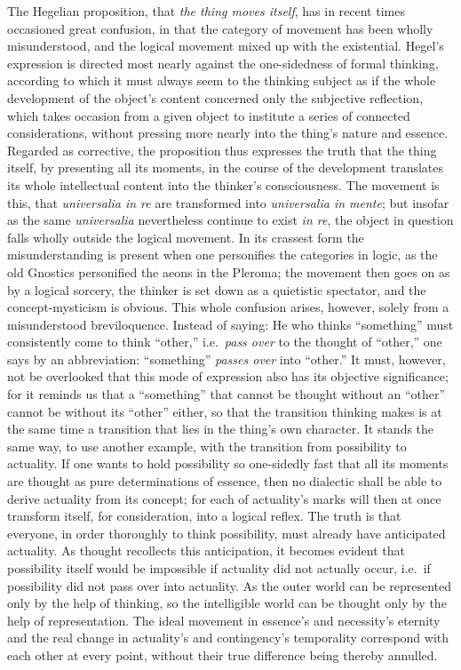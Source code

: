 \documentclass[12pt]{book}
\begin{document}
The Hegelian proposition, that \emph{the thing moves itself}, has in recent
times occasioned great confusion, in that the category of movement has been
wholly misunderstood, and the logical movement mixed up with the
existential. Hegel's expression is directed most nearly against the
one-sidedness of formal thinking, according to which it must always seem to
the thinking subject as if the whole development of the object's content
concerned only the subjective reflection, which takes occasion from a given
object to institute a series of connected considerations, without pressing
more nearly into the thing's nature and essence. Regarded as corrective, the
proposition thus expresses the truth that the thing itself, by presenting
all its moments, in the course of the development translates its whole
intellectual content into the thinker's consciousness. The movement is this,
that \textit{universalia in re} are transformed into \textit{universalia in
mente}; but insofar as the same \textit{universalia} nevertheless continue
to exist \textit{in re}, the object in question falls wholly outside the
logical movement. In its crassest form the misunderstanding is present when
one personifies the categories in logic, as the old Gnostics personified the
aeons in the Pleroma; the movement then goes on as by a logical sorcery, the
thinker is set down as a quietistic spectator, and the concept-mysticism is
obvious. This whole confusion arises, however, solely from a misunderstood
breviloquence. Instead of saying: He who thinks ``something'' must
consistently come to think ``other,'' i.e.\ \emph{pass over} to the thought
of ``other,'' one says by an abbreviation: ``something'' \emph{passes over}
into ``other.'' It must, however, not be overlooked that this mode of
expression also has its objective significance; for it reminds us that a
``something'' that cannot be thought without an ``other'' cannot be without
its ``other'' either, so that the transition thinking makes is at the same
time a transition that lies in the thing's own character. It stands the same
way, to use another example, with the transition from possibility to
actuality. If one wants to hold possibility so one-sidedly fast that all its
moments are thought as pure determinations of essence, then no dialectic
shall be able to derive actuality from its concept; for each of actuality's
marks will then at once transform itself, for consideration, into a logical
reflex. The truth is that everyone, in order thoroughly to think
possibility, must already have anticipated actuality. As thought recollects
this anticipation, it becomes evident that possibility itself would be
impossible if actuality did not actually occur, i.e.\ if possibility did not
pass over into actuality. As the outer world can be represented only by the
help of thinking, so the intelligible world can be thought only by the help
of representation. The ideal movement in essence's and necessity's eternity
and the real change in actuality's and contingency's temporality correspond
with each other at every point, without their true difference being thereby
annulled.
\end{document}
